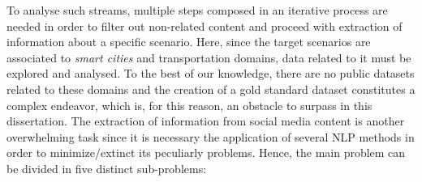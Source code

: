 \iffalse
To analyse such streams, multiple steps composed in an iterative process are needed in order to filter out non-related content and proceed with extraction of information about a specific scenario. Here, since the target scenarios are associated to \textit{smart cities} and transportation domains, data related to it must be explored and analysed. To the best of our knowledge, there are no public datasets related to these domains and the creation of a gold standard dataset constitutes a complex endeavor, which is, for this reason, an obstacle to surpass in this dissertation. The extraction of information from social media content is another overwhelming task since it is necessary the application of several \gls{NLP} methods in order to minimize/extinct its peculiarly problems. Hence, the main problem can be divided in five distinct sub-problems:

